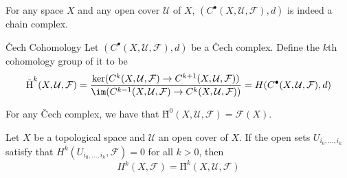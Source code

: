 \documentclass[a4paper]{article}
\begin{document}
\begin{lmm}{}{} For any space $X$ and any open cover $\mathcal{U}$ of $X$, $(C^\bullet(X,\mathcal{U},\mathcal{F}),d)$ is indeed a chain complex. 
\end{lmm}

\begin{defn}{\v{C}ech Cohomology}{} Let $(C^\bullet(X,\mathcal{U},\mathcal{F}),d)$ be a \v{C}ech complex. Define the $k$th cohomology group of it to be $$\text{\v{H}}^k(X,\mathcal{U},\mathcal{F})=\frac{\ker(C^k(X,\mathcal{U},\mathcal{F})\to C^{k+1}(X,\mathcal{U},\mathcal{F}))}{\im(C^{k-1}(X,\mathcal{U},\mathcal{F})\to C^k(X,\mathcal{U},\mathcal{F}))}=H(C^\bullet(X,\mathcal{U},\mathcal{F}),d)$$
\end{defn}

\begin{lmm}{}{} For any \v{C}ech complex, we have that $\text{\v{H}}^0(X,\mathcal{U},\mathcal{F})=\mathcal{F}(X)$. 
\end{lmm}

\begin{thm}{}{} Let $X$ be a topological space and $\mathcal{U}$ an open cover of $X$. If the open sets $U_{i_0,\dots,i_k}$ satisfy that $H^k(U_{i_0,\dots,i_k},\mathcal{F})=0$ for all $k>0$, then $$H^k(X,\mathcal{F})=\text{\v{H}}^k(X,\mathcal{U},\mathcal{F})$$
\end{thm}
\end{document}
